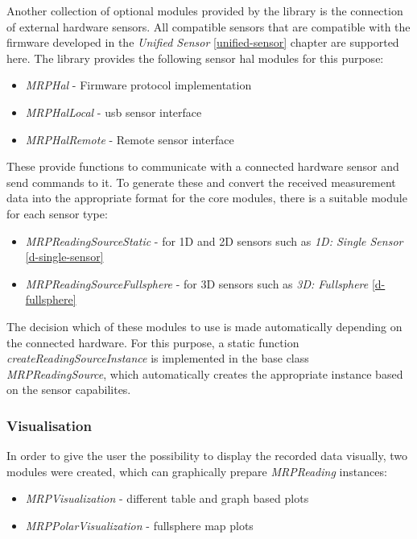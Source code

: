 Another collection of optional modules provided by the library is the
connection of external hardware sensors. All compatible sensors that are
compatible with the firmware developed in the \emph{Unified Sensor}
\ref{unified-sensor} chapter are supported here. The library provides
the following sensor \gls{hal} modules for this purpose:

\begin{itemize}
\tightlist
\item
  \emph{MRPHal} - Firmware protocol implementation
\item
  \emph{MRPHalLocal} - \gls{usb} sensor interface
\item
  \emph{MRPHalRemote} - Remote sensor interface
\end{itemize}

These provide functions to communicate with a connected hardware sensor
and send commands to it. To generate these and convert the received
measurement data into the appropriate format for the core modules, there
is a suitable module for each sensor type:

\begin{itemize}
\tightlist
\item
  \emph{MRPReadingSourceStatic} - for 1D and 2D sensors such as
  \emph{1D: Single Sensor} \ref{d-single-sensor}
\item
  \emph{MRPReadingSourceFullsphere} - for 3D sensors such as \emph{3D:
  Fullsphere} \ref{d-fullsphere}
\end{itemize}

The decision which of these modules to use is made automatically
depending on the connected hardware. For this purpose, a static function
\emph{createReadingSourceInstance} is implemented in the base class
\emph{MRPReadingSource}, which automatically creates the appropriate
instance based on the sensor capabilites.

\hypertarget{visualisation}{%
\subsubsection{Visualisation}\label{visualisation}}

In order to give the user the possibility to display the recorded data
visually, two modules were created, which can graphically prepare
\emph{MRPReading} instances:

\begin{itemize}
\tightlist
\item
  \emph{MRPVisualization} - different table and graph based plots
\item
  \emph{MRPPolarVisualization} - fullsphere map plots
\end{itemize}

